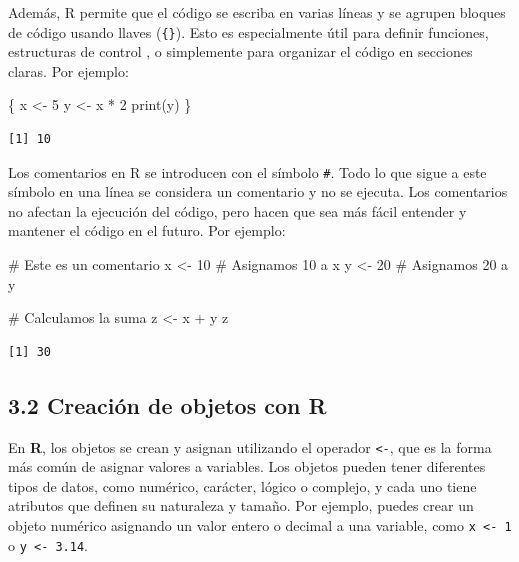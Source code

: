 \documentclass[
  letterpaper,
]{scrbook}
\newenvironment{Shaded}{\begin{snugshade}}{\end{snugshade}}
\newcommand{\CommentTok}[1]{\textcolor[rgb]{0.37,0.37,0.37}{#1}}
\newcommand{\DecValTok}[1]{\textcolor[rgb]{0.68,0.00,0.00}{#1}}
\newcommand{\FunctionTok}[1]{\textcolor[rgb]{0.28,0.35,0.67}{#1}}
\newcommand{\NormalTok}[1]{\textcolor[rgb]{0.00,0.23,0.31}{#1}}
\newcommand{\OtherTok}[1]{\textcolor[rgb]{0.00,0.23,0.31}{#1}}
\newcommand{\SpecialCharTok}[1]{\textcolor[rgb]{0.37,0.37,0.37}{#1}}
\begin{document}
Además, R permite que el código se escriba en varias líneas y se agrupen
bloques de código usando llaves (\texttt{\{\}}). Esto es especialmente
útil para definir funciones, estructuras de control , o simplemente para
organizar el código en secciones claras. Por ejemplo:

\begin{Shaded}
\begin{Highlighting}[]
\NormalTok{\{}
\NormalTok{  x }\OtherTok{\textless{}{-}} \DecValTok{5}
\NormalTok{  y }\OtherTok{\textless{}{-}}\NormalTok{ x }\SpecialCharTok{*} \DecValTok{2}
  \FunctionTok{print}\NormalTok{(y)}
\NormalTok{\}}
\end{Highlighting}
\end{Shaded}

\begin{verbatim}
[1] 10
\end{verbatim}

Los comentarios en R se introducen con el símbolo \texttt{\#}. Todo lo
que sigue a este símbolo en una línea se considera un comentario y no se
ejecuta. Los comentarios no afectan la ejecución del código, pero hacen
que sea más fácil entender y mantener el código en el futuro. Por
ejemplo:

\begin{Shaded}
\begin{Highlighting}[]
\CommentTok{\# Este es un comentario}
\NormalTok{x }\OtherTok{\textless{}{-}} \DecValTok{10}  \CommentTok{\# Asignamos 10 a x}
\NormalTok{y }\OtherTok{\textless{}{-}} \DecValTok{20}  \CommentTok{\# Asignamos 20 a y}

\CommentTok{\# Calculamos la suma}
\NormalTok{z }\OtherTok{\textless{}{-}}\NormalTok{ x }\SpecialCharTok{+}\NormalTok{ y}
\NormalTok{z}
\end{Highlighting}
\end{Shaded}

\begin{verbatim}
[1] 30
\end{verbatim}

\hypertarget{creaciuxf3n-de-objetos-con-r}{%
\subsection{3.2 Creación de objetos con
R}\label{creaciuxf3n-de-objetos-con-r}}

En \textbf{R}, los objetos se crean y asignan utilizando el operador
\texttt{\textless{}-}, que es la forma más común de asignar valores a
variables. Los objetos pueden tener diferentes tipos de datos, como
numérico, carácter, lógico o complejo, y cada uno tiene atributos que
definen su naturaleza y tamaño. Por ejemplo, puedes crear un objeto
numérico asignando un valor entero o decimal a una variable, como
\texttt{x\ \textless{}-\ 1} o \texttt{y\ \textless{}-\ 3.14}.
\end{document}

